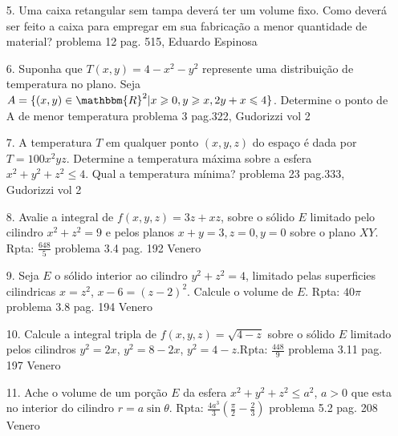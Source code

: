 \begin{itemize}
	\item[5.] Uma caixa retangular sem tampa deverá ter um volume fixo. Como deverá ser feito a caixa para empregar em sua fabricação a menor quantidade de material?
	problema 12 pag. 515, Eduardo Espinosa	
\end{itemize}
\begin{itemize}
	\item[6.] Suponha que $T(x,y)=4-x^{2}-y^{2}$ represente uma distribuição de temperatura no plano. Seja $A=\{(x,y)\in \mathbbm{R}^{2} | x\geqslant 0, y\geqslant x, 2y+x \leqslant 4\} $. Determine o ponto de A de menor temperatura 
		problema 3 pag.322, Gudorizzi vol 2	
\end{itemize}
\begin{itemize}
	\item[7.] A temperatura $T$ em qualquer ponto $(x,y,z)$ do espaço é dada por $T=100x^{2}yz$. Determine a temperatura máxima sobre a esfera $x^{2}+y^{2}+z^{2}\leqslant 4$. Qual a temperatura mínima?
		problema 23 pag.333, Gudorizzi vol 2 
\end{itemize}
\begin{itemize}
	\item[8.] Avalie a integral de $f(x,y,z)=3z+xz$, sobre o sólido $E$ limitado pelo cilindro $x^{2}+z^{2}=9$ e pelos planos $x+y=3, z=0, y=0$ sobre o plano $XY$. Rpta: $\frac{648}{5}$
	 problema 3.4 pag. 192 Venero
\end{itemize}
\begin{itemize}
	\item[9.]Seja $E$ o sólido interior ao cilindro $y^{2}+z^{2}=4$, limitado pelas superficies cilindricas $x=z^{2}$, $x-6=(z-2)^{2}$. Calcule o volume de $E$. Rpta: $40 \pi$
	 problema 3.8 pag. 194 Venero
\end{itemize}
\begin{itemize}
	\item[10.] Calcule a integral tripla de $f(x,y,z)=\sqrt{4-z}$ sobre o sólido $E$ limitado pelos cilindros $y^{2}=2x$, $y^{2}=8-2x$, $y^{2}=4-z$.Rpta: $\frac{448}{9}$
	 problema 3.11 pag. 197 Venero
\end{itemize}
\begin{itemize}
	\item [11.] Ache o volume de um porção $E$ da esfera $x^{2}+y^{2}+z^{2}\leqslant a^{2}$, $a>0$ que esta no interior do cilindro $r=a\sin \theta$. Rpta: $\frac{4a^{3}}{3}(\frac{\pi}{2}-\frac{2}{3})$
		 problema 5.2 pag. 208 Venero
\end{itemize}
